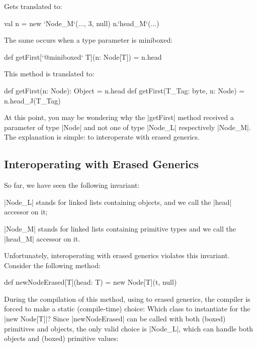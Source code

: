 Gets translated to:

\begin{lstlisting-nobreak}
 val n = new `Node_M`(..., 3, null)
 n.`head_M`(...)
\end{lstlisting-nobreak}

The same occurs when a type parameter is miniboxed:

\begin{lstlisting-nobreak}
 def getFirst[`@miniboxed` T](n: Node[T]) = n.head
\end{lstlisting-nobreak}

This method is translated to:

\begin{lstlisting-nobreak}
 def getFirst(n: Node): Object = n.head
 def getFirst(T_Tag: byte, n: Node) = n.head_J(T_Tag)
\end{lstlisting-nobreak}

At this point, you may be wondering why the |getFirst| method received a parameter of type |Node| and not one of type |Node_L| respectively |Node_M|. The explanation is simple: to interoperate with erased generics.


\subsection{Interoperating with Erased Generics}

So far, we have seen the following   invariant:
\begin{compactitem}
 \item |Node_L| stands for linked lists containing objects, and we call the |head| accessor on it;
 \item |Node_M| stands for linked lists containing primitive types and we call the |head_M| accessor on it.
\end{compactitem}

Unfortunately, interoperating with erased generics violates this invariant. Consider the following method:

\begin{lstlisting-nobreak}
 def newNodeErased[T](head: T) =
   new Node[T](t, null)
\end{lstlisting-nobreak}

During the compilation of this method, using to erased generics, the compiler is forced to make a static (compile-time) choice: Which class to instantiate for the |new Node[T]|? Since |newNodeErased| can be called with both (boxed) primitives and objects, the only valid choice is |Node_L|, which can handle both objects and (boxed) primitive values:

